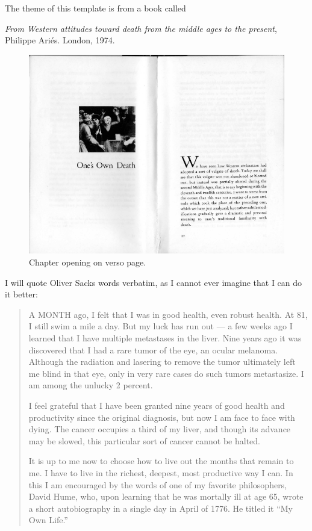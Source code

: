 {\Huge T}he theme of this template is from a book called 
{ \textit{From Western attitudes toward death from the middle ages to the present}, Philippe Ari\'es. London, 1974.

\begin{figure}
\includegraphics[width=\textwidth]{./chapters/versochapter01.png}
\caption{Chapter opening on verso page.}
\end{figure}

I will quote Oliver Sacks words verbatim, as I cannot ever imagine that I can do it better:

\begin{quote}
A MONTH ago, I felt that I was in good health, even robust health. At 81, I still swim a mile a day. But my luck has run out — a few weeks ago I learned that I have multiple metastases in the liver. Nine years ago it was discovered that I had a rare tumor of the eye, an ocular melanoma. Although the radiation and lasering to remove the tumor ultimately left me blind in that eye, only in very rare cases do such tumors metastasize. I am among the unlucky 2 percent.

I feel grateful that I have been granted nine years of good health and productivity since the original diagnosis, but now I am face to face with dying. The cancer occupies a third of my liver, and though its advance may be slowed, this particular sort of cancer cannot be halted.

It is up to me now to choose how to live out the months that remain to me. I have to live in the richest, deepest, most productive way I can. In this I am encouraged by the words of one of my favorite philosophers, David Hume, who, upon learning that he was mortally ill at age 65, wrote a short autobiography in a single day in April of 1776. He titled it “My Own Life.”


\end{quote}}
